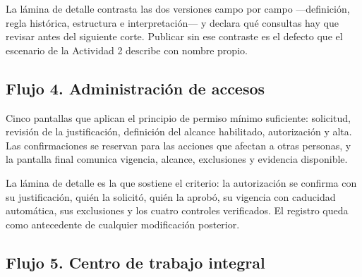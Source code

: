 La lámina de detalle contrasta las dos versiones campo por campo ---definición, regla histórica,
estructura e interpretación--- y declara qué consultas hay que revisar antes del siguiente corte.
Publicar sin ese contraste es el defecto que el escenario de la Actividad 2 describe con nombre
propio.



\clearpage
\subsection{Flujo 4. Administración de accesos}

Cinco pantallas que aplican el principio de permiso mínimo suficiente: solicitud, revisión de la
justificación, definición del alcance habilitado, autorización y alta. Las confirmaciones se
reservan para las acciones que afectan a otras personas, y la pantalla final comunica vigencia,
alcance, exclusiones y evidencia disponible.

La lámina de detalle es la que sostiene el criterio: la autorización se confirma con su
justificación, quién la solicitó, quién la aprobó, su vigencia con caducidad automática, sus
exclusiones y los cuatro controles verificados. El registro queda como antecedente de cualquier
modificación posterior.



\clearpage

\clearpage
\subsection{Flujo 5. Centro de trabajo integral}

